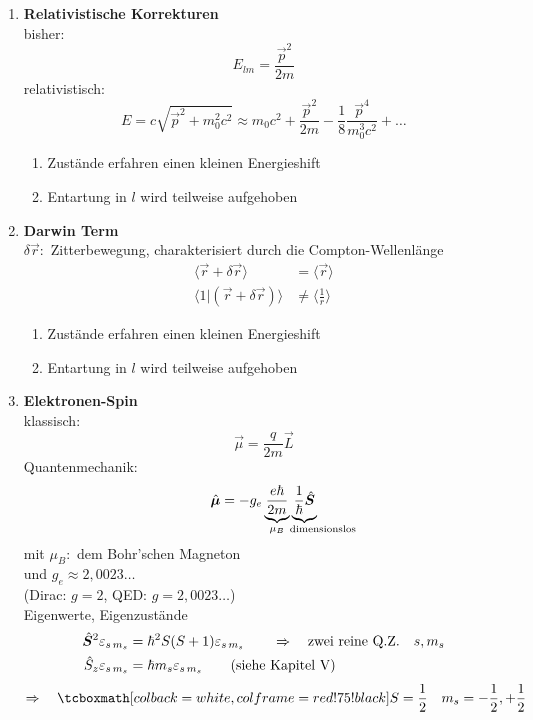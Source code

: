 \begin{enumerate}[1)]
	\item \textbf{Relativistische Korrekturen}\\
	bisher:
	\begin{equation*}
	E_{lm} = \frac{\vec{p}^2}{2m}
	\end{equation*}
	relativistisch:
	\begin{equation*}
	E = c \sqrt{\vec{p}^2 + m_0^2 c^2} \approx m_0 c^2 + \frac{\vec{p}^2}{2m} - \frac{1}{8} \frac{\vec{p}^4}{m_0^3 c^2} + \dots
	\end{equation*}
	\begin{enumerate}[$ \Rightarrow $]
		\item Zustände erfahren einen kleinen Energieshift
		\item Entartung in $ l $ wird teilweise aufgehoben
	\end{enumerate}
	\item \textbf{Darwin Term}\\
	$ \delta \vec{r} : $ Zitterbewegung, charakterisiert durch die Compton-Wellenlänge
	\begin{align*}
	\langle \vec{r} + \delta \vec{r} \rangle &= \langle \vec{r} \rangle \\
	\langle 1 | (\vec{r} + \delta \vec{r}) \rangle &\neq \langle \frac{1}{r} \rangle
	\end{align*}
	\begin{enumerate}[$ \Rightarrow $]
		\item Zustände erfahren einen kleinen Energieshift
		\item Entartung in $ l $ wird teilweise aufgehoben
	\end{enumerate}
	\item \textbf{Elektronen-Spin}\\
	klassisch:
	\begin{equation*}
	\vec{\mu} = \frac{q}{2m} \vec{L}
	\end{equation*}
	Quantenmechanik:
	\begin{equation*}
	\hat{\vec{\mu}} = - g_e \ub{\frac{e \hbar}{2m}}_{\mu_{B}} \ub{\frac{1}{\hbar} \hat{\vec{S}}}_{\mathclap{ \qquad \ \ \tx{dimensionslos}}}
	\end{equation*}
	mit $ \mu_B : $ dem Bohr'schen Magneton\\
	und $ g_e \approx 2{,}0023 \dots $\\
	(Dirac: $ g = 2 $, QED: $ g = 2{,}0023 \dots $)\\[5pt]
	Eigenwerte, Eigenzustände
	\begin{align*}
	\hat{\bm{S}}^2 \varepsilon_{s \, m_s} &= \hbar^2 S (S + 1) \varepsilon_{s \, m_s} \qquad \Rightarrow \quad \textrm{zwei reine Q.Z.} \quad s, m_s\\
	\hat{S}_z \varepsilon_{s \, m_s} &= \hbar m_s \varepsilon_{s \, m_s} \qquad (\textrm{siehe Kapitel V})
	\end{align*}
	\begin{equation*}
	\Rightarrow \quad \rmbox{ S = \frac{1}{2} \quad m_s = - \frac{1}{2}, + \frac{1}{2} }
	\end{equation*}
\end{enumerate}



